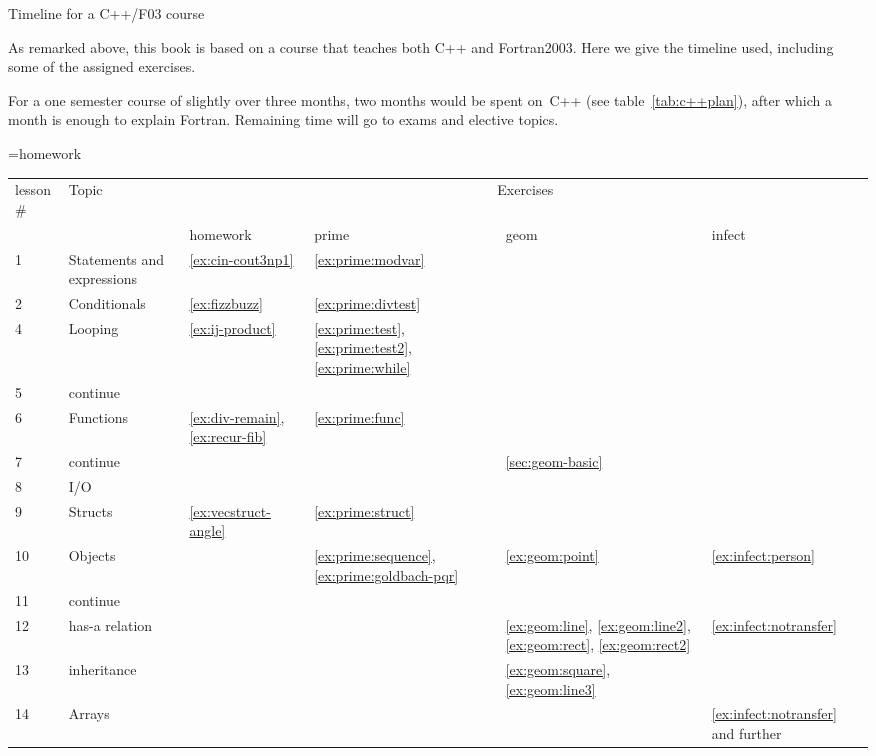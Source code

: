  {Timeline for a C++/F03 course}

As remarked above, this book is based on a course that teaches both
C++ and Fortran2003. Here we give the timeline used, including some of
the assigned exercises.

For a one semester course of slightly over three months, two months
would be spent on~C++ (see table~\ref{tab:c++plan}), after which a
month is enough to explain Fortran. Remaining time will go to exams
and elective topics.

\begin{table}[ht]
  =\hbox{homework }\edef\colwidth{\the\wd0}
  \begin{tabular}{|l|p{\colwidth}|p{\colwidth}p{\colwidth}p{\colwidth}p{\colwidth}|}
    \hline
    lesson$\#$&Topic&\multicolumn{4}{c|}{Exercises}\\
    &&homework&prime&geom&infect\\
    \hline
    1 & Statements and expressions
        &\ref{ex:cin-cout3np1}
        &\ref{ex:prime:modvar}&&\\
    2 & Conditionals
        &\ref{ex:fizzbuzz}&\ref{ex:prime:divtest}&&\\
    4 & Looping
        &\ref{ex:ij-product}
        &\ref{ex:prime:test}, \ref{ex:prime:test2}, \ref{ex:prime:while}&&\\
    5 & continue
        &&&&\\
    6 & Functions
        &\ref{ex:div-remain},\ref{ex:recur-fib}&\ref{ex:prime:func}&&\\
    7 & continue
        &&&\ref{sec:geom-basic}&\\
    8 & I/O 
        &&&&\\
    9 & Structs
        &\ref{ex:vecstruct-angle}&\ref{ex:prime:struct}&&\\
    10 & Objects
        &&\ref{ex:prime:sequence}, \ref{ex:prime:goldbach-pqr}&
        \ref{ex:geom:point}&\ref{ex:infect:person}\\
    11 & continue
        &&&&\\
    12 & has-a relation
        &&&\ref{ex:geom:line}, \ref{ex:geom:line2},
        \ref{ex:geom:rect}, \ref{ex:geom:rect2}&\ref{ex:infect:notransfer}\\
    13 & inheritance
        &&&\ref{ex:geom:square}, \ref{ex:geom:line3}&\\
    14 & Arrays
        &&&&\ref{ex:infect:notransfer} and further\\

\end{tabular}
\end{table}
